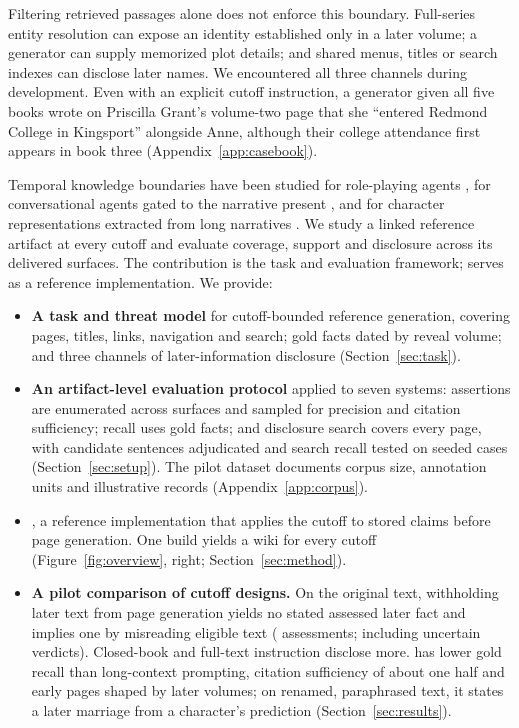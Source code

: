 Filtering retrieved passages alone does not enforce this boundary. Full-series entity
resolution can expose an identity established only in a later volume; a generator can supply
memorized plot details; and shared menus, titles or search indexes can disclose later names.
We encountered all three channels during development. Even with an explicit cutoff
instruction, a generator given all five books wrote on Priscilla Grant's volume-two page
that she ``entered Redmond College in Kingsport'' alongside Anne, although their college
attendance first appears in book three (Appendix~\ref{app:casebook}).

Temporal knowledge boundaries have been studied for role-playing agents
\citep{ahn2024timechara}, for conversational agents gated to the narrative present
\citep{huang2025living}, and for character representations extracted from long narratives
\citep{gurung2024chiron}. We study a linked reference artifact at every cutoff and evaluate
coverage, support and disclosure across its delivered surfaces. The contribution is the
task and evaluation framework; \sys serves as a reference implementation. We provide:
\begin{itemize}[leftmargin=*,itemsep=1pt,topsep=2pt]
  \item \textbf{A task and threat model} for cutoff-bounded reference generation, covering
    pages, titles, links, navigation and search; gold facts dated by reveal volume; and three
    channels of later-information disclosure
    (Section~\ref{sec:task}).
  \item \textbf{An artifact-level evaluation protocol} applied to seven systems: assertions
    are enumerated across surfaces and sampled for precision and citation sufficiency;
    recall uses  gold facts; and disclosure search covers every page,
    with candidate sentences adjudicated and search recall tested on seeded cases
    (Section~\ref{sec:setup}). The pilot dataset documents corpus size, annotation units and
    illustrative records (Appendix~\ref{app:corpus}).
  \item \textbf{\sys}, a reference implementation that applies the cutoff to stored claims
    before page generation. One build yields a wiki for every cutoff (Figure~\ref{fig:overview}, right;
    Section~\ref{sec:method}).
  \item \textbf{A pilot comparison of cutoff designs.} On the original text, withholding
    later text from page generation yields no stated assessed later fact and \sys implies one by
    misreading eligible text ( assessments;
     including uncertain verdicts). Closed-book and full-text
    instruction disclose more. \sys has lower gold recall than long-context prompting,
    citation sufficiency of about one half and early pages shaped by later volumes\ifnwdecon{};
    on renamed, paraphrased text, it states a later marriage from a character's prediction\fi{}
    (Section~\ref{sec:results}).
\end{itemize}
